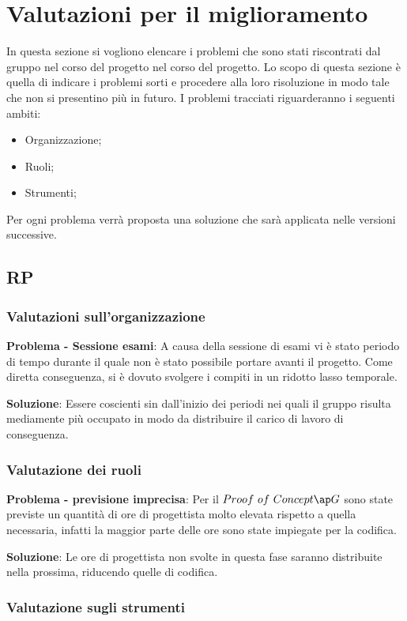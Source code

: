 \section{Valutazioni per il miglioramento}
In questa sezione si vogliono elencare i problemi che sono stati riscontrati dal gruppo nel corso del progetto nel corso del progetto. Lo scopo di questa sezione è quella di indicare i problemi sorti e procedere alla loro risoluzione in modo tale che non si presentino più in futuro.
I problemi tracciati riguarderanno i seguenti ambiti:
\begin{itemize}
\item Organizzazione;
\item Ruoli;
\item Strumenti;
\end{itemize}
Per ogni problema verrà proposta una soluzione che sarà applicata nelle versioni successive.

\subsection{RP}
\subsubsection{Valutazioni sull'organizzazione}
\textbf{Problema - Sessione esami}: A causa della sessione di esami vi è stato periodo di tempo durante il quale non è stato possibile portare avanti il progetto. Come diretta conseguenza, si è dovuto svolgere i compiti in un ridotto lasso temporale.

\textbf{Soluzione}: Essere coscienti sin dall'inizio dei periodi nei quali il gruppo risulta mediamente più occupato in modo da distribuire il carico di lavoro di conseguenza. 

\subsubsection{Valutazione dei ruoli}

\textbf{Problema - previsione imprecisa}: Per il $\glo{Proof$ $of$ $Concept}$ sono state previste un quantità di ore di progettista molto elevata rispetto a quella necessaria, infatti la maggior parte delle ore sono state impiegate per la codifica.

\textbf{Soluzione}: Le ore di progettista non svolte in questa fase saranno distribuite nella prossima, riducendo quelle di codifica.


\subsubsection{Valutazione sugli strumenti}

